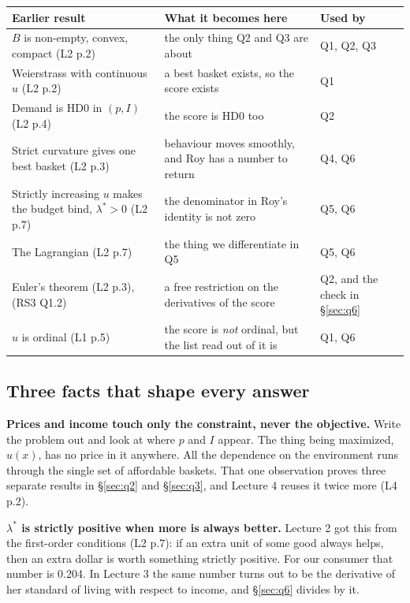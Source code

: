 \documentclass[11pt,letterpaper]{article}
\theoremstyle{definition}
\theoremstyle{plain}
\newcommand{\src}[1]{{\small\textsf{(#1)}}}
\begin{document}
\begin{center}
\begin{tabular}{@{}p{} p{} p{}@{}}
\toprule
\textbf{Earlier result} & \textbf{What it becomes here} & \textbf{Used by} \\
\midrule
$B$ is non-empty, convex, compact \src{L2 p.2} & the only thing Q2 and Q3 are about & Q1, Q2, Q3 \\
Weierstrass with continuous $u$ \src{L2 p.2} & a best basket exists, so the score exists & Q1 \\
Demand is HD0 in $(p,I)$ \src{L2 p.4} & the score is HD0 too & Q2 \\
Strict curvature gives one best basket \src{L2 p.3} & behaviour moves smoothly, and Roy has a number to return & Q4, Q6 \\
Strictly increasing $u$ makes the budget bind, $\lambda^* > 0$ \src{L2 p.7} & the denominator in Roy's identity is not zero & Q5, Q6 \\
The Lagrangian \src{L2 p.7} & the thing we differentiate in Q5 & Q5, Q6 \\
Euler's theorem \src{L2 p.3}, \src{RS3 Q1.2} & a free restriction on the derivatives of the score & Q2, and the check in \S\ref{sec:q6} \\
$u$ is ordinal \src{L1 p.5} & the score is \emph{not} ordinal, but the list read out of it is & Q1, Q6 \\
\bottomrule
\end{tabular}
\end{center}

\subsection{Three facts that shape every answer}

\textbf{Prices and income touch only the constraint, never the objective.} Write the problem out and
look at where $p$ and $I$ appear. The thing being maximized, $u(x)$, has no price in it anywhere. All
the dependence on the environment runs through the single set of affordable baskets. That one
observation proves three separate results in \S\ref{sec:q2} and \S\ref{sec:q3}, and Lecture 4 reuses
it twice more \src{L4 p.2}.

\textbf{$\lambda^*$ is strictly positive when more is always better.} Lecture 2 got this from the
first-order conditions \src{L2 p.7}: if an extra unit of some good always helps, then an extra dollar
is worth something strictly positive. For our consumer that number is 0.204. In Lecture 3 the same
number turns out to be the derivative of her standard of living with respect to income, and
\S\ref{sec:q6} divides by it.
\end{document}
